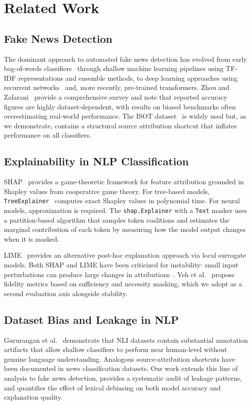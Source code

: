 \documentclass[journal,10pt,twocolumn]{IEEEtran}
\begin{document}
\section{Related Work}
\label{sec:related}

\subsection{Fake News Detection}
The dominant approach to automated fake news detection has evolved from
early bag-of-words classifiers~\cite{perez2018automatic} through
shallow machine learning pipelines using TF-IDF representations and
ensemble methods, to deep learning approaches using recurrent
networks~\cite{ruchansky2017csi} and, more recently, pre-trained
transformers.  Zhou and Zafarani~\cite{zhou2020survey} provide a
comprehensive survey and note that reported accuracy figures are highly
dataset-dependent, with results on biased benchmarks often
overestimating real-world performance.  The ISOT dataset~\cite{ahmed2018detecting}
is widely used but, as we demonstrate, contains a structural source
attribution shortcut that inflates performance on all classifiers.

\subsection{Explainability in NLP Classification}
SHAP~\cite{lundberg2017unified} provides a game-theoretic framework for
feature attribution grounded in Shapley values from cooperative game
theory.  For tree-based models, \texttt{TreeExplainer}~\cite{lundberg2020local}
computes exact Shapley values in polynomial time.  For neural models,
approximation is required.  The \texttt{shap.Explainer} with a
\texttt{Text} masker uses a partition-based algorithm that samples token
coalitions and estimates the marginal contribution of each token by
measuring how the model output changes when it is masked.

LIME~\cite{ribeiro2016should} provides an alternative post-hoc
explanation approach via local surrogate models.  Both SHAP and LIME
have been criticized for instability: small input perturbations can
produce large changes in attributions~\cite{alvarez2018robustness}.
Yeh et al.~\cite{yeh2019fidelity} propose fidelity metrics based on
sufficiency and necessity masking, which we adopt as a second evaluation
axis alongside stability.

\subsection{Dataset Bias and Leakage in NLP}
Gururangan et al.~\cite{gururangan2018annotation} demonstrate that NLI
datasets contain substantial annotation artifacts that allow shallow
classifiers to perform near human-level without genuine language
understanding.  Analogous source-attribution shortcuts have been
documented in news classification datasets.  Our work extends this line
of analysis to fake news detection, provides a systematic audit of
leakage patterns, and quantifies the effect of lexical debiasing on
both model accuracy and explanation quality.
\end{document}
